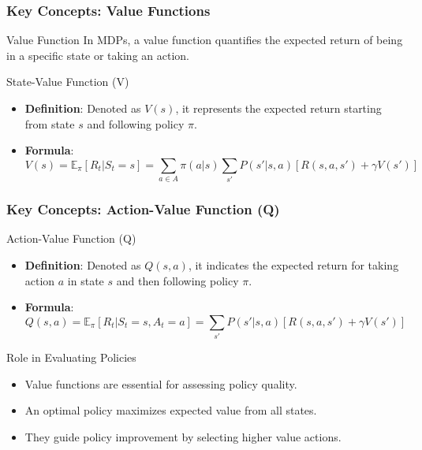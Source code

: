 \documentclass[aspectratio=169]{beamer}
\begin{document}
\begin{frame}[fragile]
    \frametitle{Key Concepts: Value Functions}
    \begin{block}{Value Function}
        In MDPs, a value function quantifies the expected return of being in a specific state or taking an action. 
    \end{block}
    
    \begin{block}{State-Value Function (V)}
        \begin{itemize}
            \item \textbf{Definition}: Denoted as \( V(s) \), it represents the expected return starting from state \( s \) and following policy \( \pi \).
            \item \textbf{Formula}:
            \begin{equation}
            V(s) = \mathbb{E}_{\pi} [R_t | S_t = s] = \sum_{a \in A} \pi(a|s) \sum_{s'} P(s'|s, a) \left[ R(s, a, s') + \gamma V(s') \right]
            \end{equation}
        \end{itemize}
    \end{block}
\end{frame}

\begin{frame}[fragile]
    \frametitle{Key Concepts: Action-Value Function (Q)}
    \begin{block}{Action-Value Function (Q)}
        \begin{itemize}
            \item \textbf{Definition}: Denoted as \( Q(s, a) \), it indicates the expected return for taking action \( a \) in state \( s \) and then following policy \( \pi \).
            \item \textbf{Formula}:
            \begin{equation}
            Q(s, a) = \mathbb{E}_{\pi} [R_t | S_t = s, A_t = a] = \sum_{s'} P(s'|s, a) \left[ R(s, a, s') + \gamma V(s') \right]
            \end{equation}
        \end{itemize}
    \end{block}
    
    \begin{block}{Role in Evaluating Policies}
        \begin{itemize}
            \item Value functions are essential for assessing policy quality.
            \item An optimal policy maximizes expected value from all states.
            \item They guide policy improvement by selecting higher value actions.
        \end{itemize}
    \end{block}
\end{frame}
\end{document}
